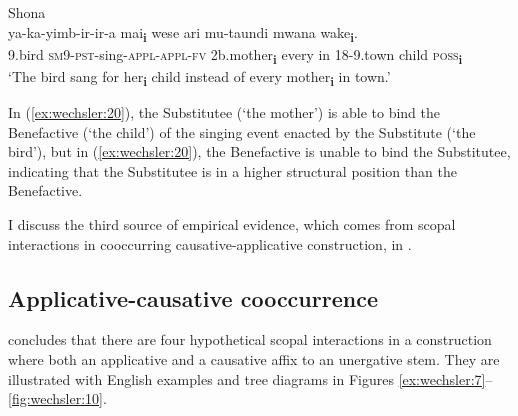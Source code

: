 \documentclass[output=paper,modfonts,nonflat,colorlinks,citecolor=brown]{langsci/langscibook}
\begin{document}
\ea\label{ex:wechsler:20}
Shona\\
\ea
{} {ya-ka-yimb-ir-ir-a} {mai}\textbf{{\textsubscript{i}}} {wese} {ari}  {{mu-taundi}}  {{mwana}} {wake}\textbf{{\textsubscript{i}}}.\\
 9.bird  \textsc{sm}9-\textsc{pst}{}-sing-\textsc{appl-appl-fv}  2b.mother\textbf{\textsubscript{i}}  every  in  {18-9.town}  {child}  \textsc{poss}\textbf{\textsubscript{i}}\\
\glt `The bird sang for her\textbf{\textsubscript{i}} child instead of every mother\textbf{\textsubscript{i}} in town.’   \\

\z
\z

In (\ref{ex:wechsler:20}), the Substitutee (‘the mother’) is able to bind the Benefactive (‘the child’) of the singing event enacted by the Substitute (‘the bird’), but in (\ref{ex:wechsler:20}), the Benefactive is unable to bind the Substitutee, indicating that the Substitutee is in a higher structural position than the Benefactive.



I discuss the third source of empirical evidence, which comes from scopal interactions in cooccurring causative-applicative construction, in .

\subsection{Applicative-causative cooccurrence}\label{sec:wechsler:3.4}

\citet{Wechsler2016} concludes that there are four hypothetical scopal interactions in a construction where both an applicative and a causative affix to an unergative stem. They are illustrated with English examples and tree diagrams in Figures \ref{ex:wechsler:7}--\ref{fig:wechsler:10}.
\end{document}

